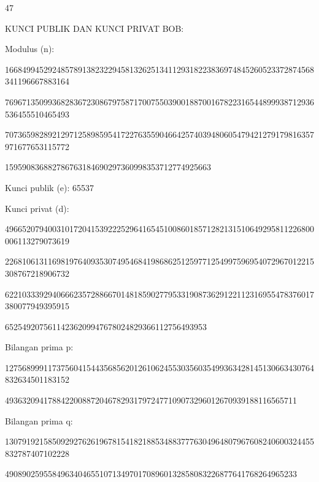 \documentclass{article}
\begin{document}

47

KUNCI PUBLIK DAN KUNCI PRIVAT BOB:

Modulus (n): 

166849945292485789138232294581326251341129318223836974845260523372874568341196667883164

769671350993682836723086797587170075503900188700167822316544899938712936536455510465493

707365982892129712589859541722763559046642574039480605479421279179816357971677653115772

159590836882786763184690297360998353712774925663

Kunci publik (e): 65537

Kunci privat (d): 

496652079400310172041539222529641654510086018571282131510649295811226800006113279073619

226810613116981976409353074954684198686251259771254997596954072967012215308767218906732

622103339294066623572886670148185902779533190873629122112316955478376017380077949395915

65254920756114236209947678024829366112756493953

Bilangan prima p: 

127568999117375604154435685620126106245530356035499363428145130663430764832634501183152

49363209417884220088720467829317972477109073296012670939188116565711

Bilangan prima q:


130791921585092927626196781541821885348837776304964807967608240600324455832787407102228

49089025955849634046551071349701708960132858083226877641768264965233
\end{document}
